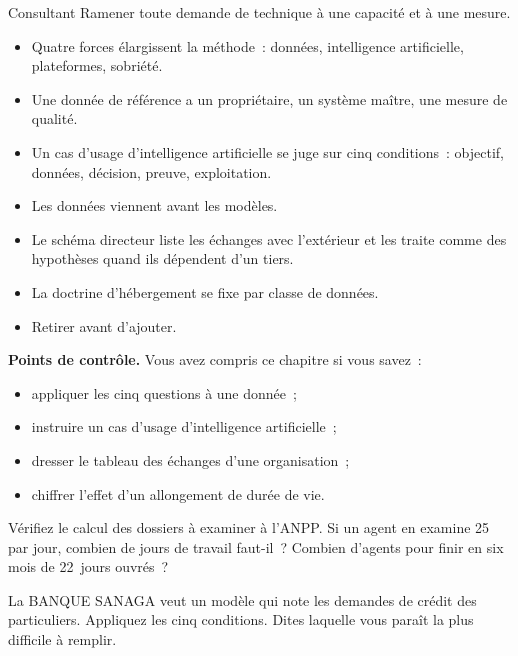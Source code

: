 \begin{boxmetier}{Consultant}
Ramener toute demande de technique à une capacité et à une mesure.
\end{boxmetier}

\begin{boxresume}
\begin{itemize}
    \item Quatre forces élargissent la méthode~: données, intelligence artificielle, plateformes, sobriété.
    \item Une donnée de référence a un propriétaire, un système maître, une mesure de qualité.
    \item Un cas d'usage d'intelligence artificielle se juge sur cinq conditions~: objectif, données, décision, preuve, exploitation.
    \item Les données viennent avant les modèles.
    \item Le schéma directeur liste les échanges avec l'extérieur et les traite comme des hypothèses quand ils dépendent d'un tiers.
    \item La doctrine d'hébergement se fixe par classe de données.
    \item Retirer avant d'ajouter.
\end{itemize}
\end{boxresume}

\begin{boxinfo}
\textbf{Points de contrôle.} Vous avez compris ce chapitre si vous savez~:
\begin{itemize}
    \item appliquer les cinq questions à une donnée~;
    \item instruire un cas d'usage d'intelligence artificielle~;
    \item dresser le tableau des échanges d'une organisation~;
    \item chiffrer l'effet d'un allongement de durée de vie.
\end{itemize}
\end{boxinfo}

\begin{boxexo}[title={\ding{45}\quad Exercice~15.1. Les doublons \niveaubase}]
Vérifiez le calcul des dossiers à examiner à l'ANPP. Si un agent en examine 25 par jour, combien de jours de travail faut-il~? Combien d'agents pour finir en six mois de 22~jours ouvrés~?
\end{boxexo}

\begin{boxexo}[title={\ding{45}\quad Exercice~15.2. Cinq conditions \niveaumoyen}]
La BANQUE SANAGA veut un modèle qui note les demandes de crédit des particuliers. Appliquez les cinq conditions. Dites laquelle vous paraît la plus difficile à remplir.
\end{boxexo}

